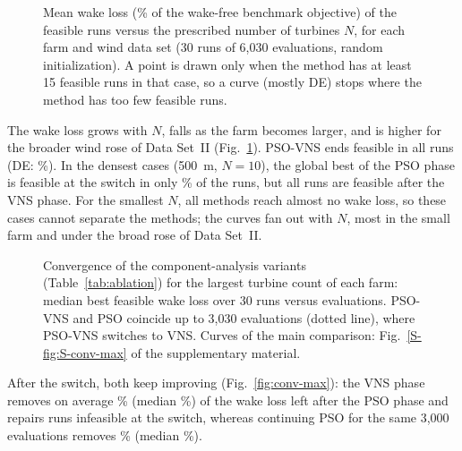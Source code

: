 \begin{figure}[!t]
\centering
{}
\caption{Mean wake loss (\% of the wake-free benchmark objective) of the feasible runs versus the prescribed number of turbines $N$, for each farm and wind data set (30 runs of 6,030 evaluations, random initialization). A point is drawn only when the method has at least 15 feasible runs in that case, so a curve (mostly DE) stops where the method has too few feasible runs.}
\label{fig:wakeloss}
\end{figure}
The wake loss grows with $N$, falls as the farm becomes larger, and is higher for the broader wind rose of Data Set~II (Fig.~\ref{fig:wakeloss}). PSO-VNS ends feasible in all runs (DE: \NFeasDE\%). In the densest cases (500~m, $N=10$), the global best of the PSO phase is feasible at the switch in only \NDenseSwitchFeas\% of the runs, but all runs are feasible after the VNS phase.
For the smallest $N$, all methods reach almost no wake loss, so these cases cannot separate the methods; the curves fan out with $N$, most in the small farm and under the broad rose of Data Set~II.

\begin{figure}[!t]
\centering
{}
\caption{Convergence of the \NAblNVar{} component-analysis variants (Table~\ref{tab:ablation}) for the largest turbine count of each farm: median best feasible wake loss over 30 runs versus evaluations. PSO-VNS and PSO coincide up to 3,030 evaluations (dotted line), where PSO-VNS switches to VNS. Curves of the main comparison: Fig.~\ref{S-fig:S-conv-max} of the supplementary material.}
\label{fig:conv-max}
\label{fig:ablation}
\end{figure}

After the switch, both keep improving (Fig.~\ref{fig:conv-max}): the VNS phase removes on average \NPhTwoMean\% (median \NPhTwoMedian\%) of the wake loss left after the PSO phase and repairs \NPhTwoMadeFeas{} runs infeasible at the switch, whereas continuing PSO for the same 3,000 evaluations removes \NPsoContMean\% (median \NPsoContMedian\%).

